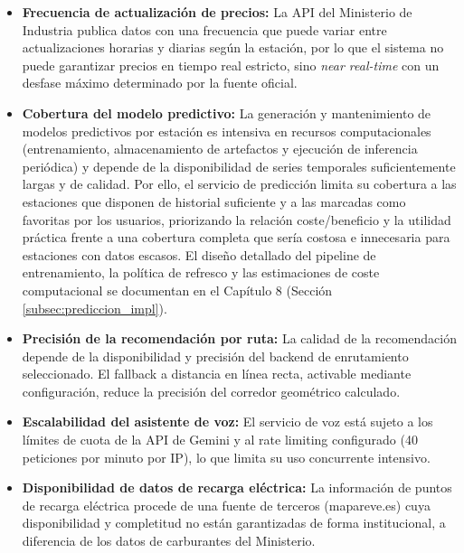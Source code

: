\begin{itemize}
      \item \textbf{Frecuencia de actualización de precios:} La API del
            Ministerio de Industria publica datos con una frecuencia que puede
            variar entre actualizaciones horarias y diarias según la estación,
            por lo que el sistema no puede garantizar precios en tiempo real
            estricto, sino \textit{near real-time} con un desfase máximo
            determinado por la fuente oficial.
      \item \textbf{Cobertura del modelo predictivo:} La generación y mantenimiento de modelos predictivos por estación es intensiva
            en recursos computacionales (entrenamiento, almacenamiento de artefactos y ejecución de inferencia periódica) y
            depende de la disponibilidad de series temporales suficientemente largas y de calidad. Por ello, el servicio de
            predicción limita su cobertura a las estaciones que disponen de historial suficiente y a las marcadas como favoritas por los usuarios,
            priorizando la relación coste/beneficio y la utilidad práctica frente a una cobertura completa que sería costosa e innecesaria para
            estaciones con datos escasos. El diseño detallado del pipeline de entrenamiento, la política de refresco y las estimaciones de coste
            computacional se documentan en el Capítulo 8 (Sección \ref{subsec:prediccion_impl}).

      \item \textbf{Precisión de la recomendación por ruta:} La calidad
            de la recomendación depende de la disponibilidad y precisión del
            backend de enrutamiento seleccionado. El fallback a distancia
            en línea recta, activable mediante configuración, reduce la
            precisión del corredor geométrico calculado.

      \item \textbf{Escalabilidad del asistente de voz:} El servicio de
            voz está sujeto a los límites de cuota de la API de Gemini y al
            rate limiting configurado (40 peticiones por minuto por IP),
            lo que limita su uso concurrente intensivo.

      \item \textbf{Disponibilidad de datos de recarga eléctrica:}
            La información de puntos de recarga eléctrica procede de una
            fuente de terceros (mapareve.es) cuya disponibilidad y
            completitud no están garantizadas de forma institucional,
            a diferencia de los datos de carburantes del Ministerio.
\end{itemize}

